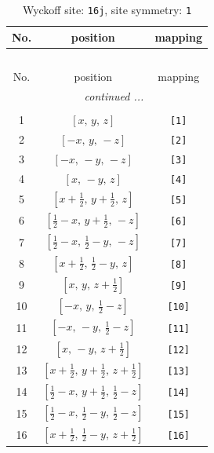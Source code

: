 \documentclass[fleqn,8pt]{jsarticle}
\begin{document}
\begin{longtable}{ccc}
\caption{Wyckoff site: {\tt 16j}, site symmetry: {\tt 1}}
 \\
 \hline \hline
No. & position & mapping \\ \hline \endfirsthead

\multicolumn{2}{l}{\tablename\ \thetable{}} \\
 \hline \hline
No. & position & mapping \\ \hline \endhead

 \hline \hline
\multicolumn{2}{r}{\footnotesize\it continued ...} \\ \endfoot

 \hline \hline
\multicolumn{2}{r}{} \\ \endlastfoot

1 & $\left[ x,\, y,\, z \right]$ & {\tt [1]} \\ \hline
2 & $\left[ - x,\, y,\, - z \right]$ & {\tt [2]} \\ \hline
3 & $\left[ - x,\, - y,\, - z \right]$ & {\tt [3]} \\ \hline
4 & $\left[ x,\, - y,\, z \right]$ & {\tt [4]} \\ \hline
5 & $\left[ x + \frac{1}{2},\, y + \frac{1}{2},\, z \right]$ & {\tt [5]} \\ \hline
6 & $\left[ \frac{1}{2} - x,\, y + \frac{1}{2},\, - z \right]$ & {\tt [6]} \\ \hline
7 & $\left[ \frac{1}{2} - x,\, \frac{1}{2} - y,\, - z \right]$ & {\tt [7]} \\ \hline
8 & $\left[ x + \frac{1}{2},\, \frac{1}{2} - y,\, z \right]$ & {\tt [8]} \\ \hline
9 & $\left[ x,\, y,\, z + \frac{1}{2} \right]$ & {\tt [9]} \\ \hline
10 & $\left[ - x,\, y,\, \frac{1}{2} - z \right]$ & {\tt [10]} \\ \hline
11 & $\left[ - x,\, - y,\, \frac{1}{2} - z \right]$ & {\tt [11]} \\ \hline
12 & $\left[ x,\, - y,\, z + \frac{1}{2} \right]$ & {\tt [12]} \\ \hline
13 & $\left[ x + \frac{1}{2},\, y + \frac{1}{2},\, z + \frac{1}{2} \right]$ & {\tt [13]} \\ \hline
14 & $\left[ \frac{1}{2} - x,\, y + \frac{1}{2},\, \frac{1}{2} - z \right]$ & {\tt [14]} \\ \hline
15 & $\left[ \frac{1}{2} - x,\, \frac{1}{2} - y,\, \frac{1}{2} - z \right]$ & {\tt [15]} \\ \hline
16 & $\left[ x + \frac{1}{2},\, \frac{1}{2} - y,\, z + \frac{1}{2} \right]$ & {\tt [16]} \\
\end{longtable}
\end{document}
